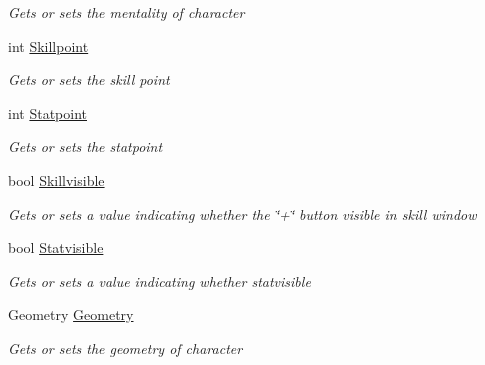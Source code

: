 \begin{DoxyCompactItemize}
\begin{DoxyCompactList}\small\item\em Gets or sets the mentality of character \end{DoxyCompactList}\item 
int \hyperlink{class_lightdeath_1_1_character__classes_ac11ac087b9c402dd158b55cd340c6798}{Skillpoint}
\begin{DoxyCompactList}\small\item\em Gets or sets the skill point \end{DoxyCompactList}\item 
int \hyperlink{class_lightdeath_1_1_character__classes_a9646006f2f6946c26d2252b4d6aadb87}{Statpoint}
\begin{DoxyCompactList}\small\item\em Gets or sets the statpoint \end{DoxyCompactList}\item 
bool \hyperlink{class_lightdeath_1_1_character__classes_a61657a10d7705a17f356c4bf9033d18d}{Skillvisible}
\begin{DoxyCompactList}\small\item\em Gets or sets a value indicating whether the \char`\"{}+\char`\"{} button visible in skill window \end{DoxyCompactList}\item 
bool \hyperlink{class_lightdeath_1_1_character__classes_a1fa3c352e68bc979f5f4bd2aad54cff0}{Statvisible}
\begin{DoxyCompactList}\small\item\em Gets or sets a value indicating whether statvisible \end{DoxyCompactList}\item 
Geometry \hyperlink{class_lightdeath_1_1_character__classes_ae48c731b1e9d61ad489cbdf56020fecc}{Geometry}
\begin{DoxyCompactList}\small\item\em Gets or sets the geometry of character \end{DoxyCompactList}\item 

\end{DoxyCompactItemize}
